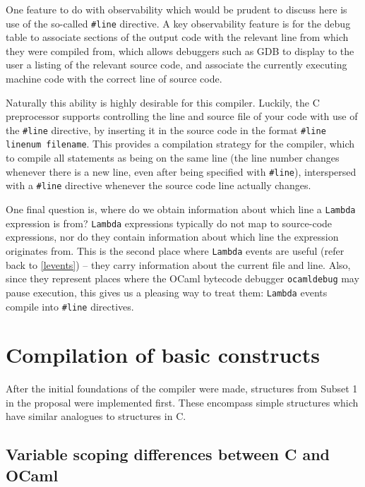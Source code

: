 \documentclass[12pt,a4paper,twoside,openright]{report}
\begin{document}
One feature to do with observability which would be prudent to discuss here is 
use of the so-called \texttt{\#}\texttt{line} directive. A key observability 
feature is for the debug table to associate sections of the output code with 
the relevant line from which they were compiled from, which allows debuggers 
such as GDB to display to the user a listing of the relevant source code, and 
associate the currently executing machine code with the correct line of source 
code.

Naturally this ability is highly desirable for this compiler. Luckily, the C 
preprocessor supports controlling the line and source file of your code with 
use of the \texttt{\#}\texttt{line} directive, by inserting it in the source 
code in the format \verb|#line linenum filename|. This provides a compilation 
strategy for the compiler, which to compile all statements as being on the same 
line (the line number changes whenever there is a new line, even after being 
specified with \verb|#line|), interspersed with a \verb|#line| directive 
whenever the source code line actually changes.

One final question is, where do we obtain information about which line a 
\texttt{Lambda} expression is from? \texttt{Lambda} expressions typically do 
not map to source-code expressions, nor do they contain information about which 
line the expression originates from. This is the second place where 
\texttt{Lambda} events are useful (refer back to \ref{levents}) -- they carry 
information about the current file and line. Also, since they represent places 
where the OCaml bytecode debugger \texttt{ocamldebug} may pause execution, this 
gives us a pleasing way to treat them: \texttt{Lambda} events compile into 
\verb|#line| directives.

\section{Compilation of basic constructs}

After the initial foundations of the compiler were made, structures from Subset 
1 in the proposal were implemented first. These encompass simple structures 
which have similar analogues to structures in C.

\subsection{Variable scoping differences between C and OCaml} 
\label{variable-scoping}
\end{document}

